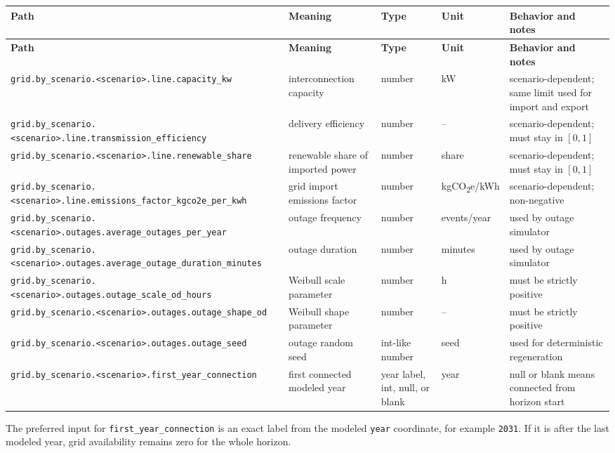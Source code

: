 \documentclass[11pt,a4paper]{report}
\newcommand{\code}[1]{\texttt{#1}}
\begin{document}
\begin{longtable}{p{}p{}p{}p{}p{}}
\toprule
\textbf{Path} & \textbf{Meaning} & \textbf{Type} & \textbf{Unit} & \textbf{Behavior and notes} \\
\midrule
\endfirsthead
\toprule
\textbf{Path} & \textbf{Meaning} & \textbf{Type} & \textbf{Unit} & \textbf{Behavior and notes} \\
\midrule
\endhead
\code{grid.by\_scenario.<scenario>.line.capacity\_kw} & interconnection capacity & number & kW & scenario-dependent; same limit used for import and export \\
\code{grid.by\_scenario.<scenario>.line.transmission\_efficiency} & delivery efficiency & number & -- & scenario-dependent; must stay in $[0,1]$ \\
\code{grid.by\_scenario.<scenario>.line.renewable\_share} & renewable share of imported power & number & share & scenario-dependent; must stay in $[0,1]$ \\
\code{grid.by\_scenario.<scenario>.line.emissions\_factor\_kgco2e\_per\_kwh} & grid import emissions factor & number & kgCO\textsubscript{2}e/kWh & scenario-dependent; non-negative \\
\code{grid.by\_scenario.<scenario>.outages.average\_outages\_per\_year} & outage frequency & number & events/year & used by outage simulator \\
\code{grid.by\_scenario.<scenario>.outages.average\_outage\_duration\_minutes} & outage duration & number & minutes & used by outage simulator \\
\code{grid.by\_scenario.<scenario>.outages.outage\_scale\_od\_hours} & Weibull scale parameter & number & h & must be strictly positive \\
\code{grid.by\_scenario.<scenario>.outages.outage\_shape\_od} & Weibull shape parameter & number & -- & must be strictly positive \\
\code{grid.by\_scenario.<scenario>.outages.outage\_seed} & outage random seed & int-like number & seed & used for deterministic regeneration \\
\code{grid.by\_scenario.<scenario>.first\_year\_connection} & first connected modeled year & year label, int, null, or blank & year & null or blank means connected from horizon start \\
\bottomrule
\end{longtable}

\begin{guidenote}
The preferred input for \code{first\_year\_connection} is an exact label from the modeled \code{year} coordinate, for example \code{2031}. If it is after the last modeled year, grid availability remains zero for the whole horizon.
\end{guidenote}
\end{document}
